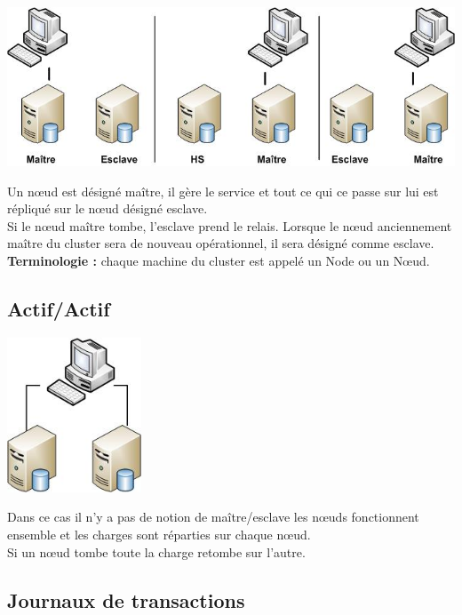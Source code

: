 \documentclass[12pt]{report}
\begin{document}
\includegraphics[width=\linewidth]{./Dessin1.jpg}

Un nœud est désigné maître, il gère le service et tout ce qui ce passe sur lui
est répliqué sur le nœud désigné esclave. \\

Si le nœud maître tombe, l’esclave prend le relais. Lorsque le nœud anciennement
maître du cluster sera de nouveau opérationnel, il sera désigné comme esclave. \\ 

\textbf{Terminologie :} chaque machine du cluster est appelé un Node ou un Nœud.

\subsection{Actif/Actif}

\begin{center}
  \includegraphics[width=0.3\textwidth]{./Dessin2.jpg}
\end{center}


Dans ce cas il n'y a pas de notion de maître/esclave les nœuds fonctionnent
ensemble et les charges sont réparties sur chaque nœud. \\

Si un nœud tombe toute la charge retombe sur l'autre. \\

\subsection{Journaux de transactions}
\end{document}
